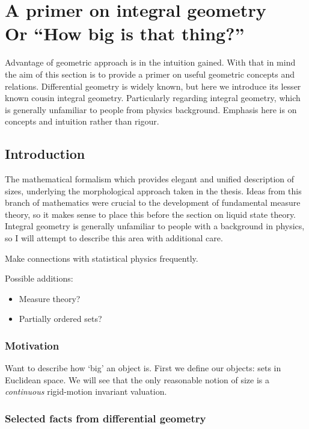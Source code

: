 \documentclass[11pt]{report}
\begin{document}
\chapter[A primer on integral geometry. Or ``How big is that thing?'']{A primer on integral geometry\\ {\large Or ``How big is that thing?''}}

Advantage of geometric approach is in the intuition gained.
With that in mind the aim of this section is to provide a primer on useful geometric concepts and relations.
Differential geometry is widely known, but here we introduce its lesser known cousin integral geometry.
Particularly regarding integral geometry, which is generally unfamiliar to people from physics background.
Emphasis here is on concepts and intuition rather than rigour.

\section{Introduction}

The mathematical formalism which provides elegant and unified description of sizes, underlying the morphological approach taken in the thesis.
Ideas from this branch of mathematics were crucial to the development of fundamental measure theory, so it makes sense to place this before the section on liquid state theory.
Integral geometry is generally unfamiliar to people with a background in physics, so I will attempt to describe this area with additional care.

Make connections with statistical physics frequently.

Possible additions:
\begin{itemize}
\item Measure theory?
\item Partially ordered sets?
\end{itemize}

\subsection{Motivation}

Want to describe how `big' an object is.
First we define our objects: sets in Euclidean space.
We will see that the only reasonable notion of size is a \emph{continuous} rigid-motion invariant valuation.

\subsection{Selected facts from differential geometry}
\end{document}
